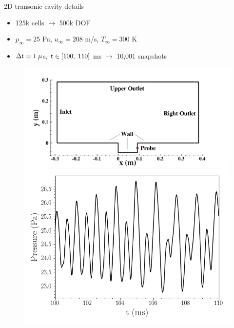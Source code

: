 \documentclass[]{beamer}
\begin{document}
\begin{frame}[noframenumbering]{2D transonic cavity details}
	\begin{itemize}
		\item 125k cells $\rightarrow$ 500k DOF
		\item $p_{\infty} = 25$ Pa, $u_{\infty} = 208$ m/s, $T_{\infty} = 300$ K
		\item $\Delta \text{t} = 1 \; \mu$s, $\text{t} \in [100, \; 110]$ ms $\rightarrow$ 10,001 snapshots
	\end{itemize}

	\begin{figure}
		\begin{minipage}{0.59\linewidth}
			\includegraphics[width=0.99\linewidth]{Images/experiments/2d_cavity/backup/geom.png}
		\end{minipage}
		\begin{minipage}{0.39\linewidth}
			\includegraphics[width=0.99\linewidth]{Images/experiments/2d_cavity/backup/pressure_probe_fom_10ms.png}
		\end{minipage}
	\end{figure}
\end{frame}
\end{document}
